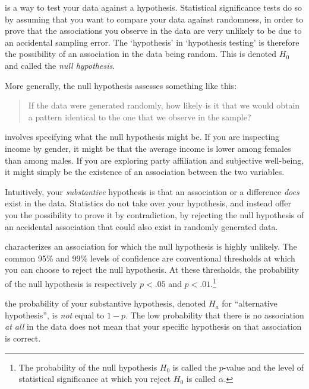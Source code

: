  is a way to test your data against a hypothesis. Statistical significance tests do so by assuming that you want to compare your data against randomness, in order to prove that the associations you observe in the data are very unlikely to be due to an accidental sampling error. The `hypothesis' in `hypothesis testing' is therefore the possibility of an association in the data being random. This is denoted $H_0$ and called the \emph{null hypothesis}.

More generally, the null hypothesis assesses something like this:

\begin{quote}
	If the data were generated randomly, how likely is it that we would obtain a pattern identical to the one that we observe in the sample?
\end{quote}

 involves specifying what the null hypothesis might be. If you are inspecting income by gender, it might be that the average income is lower among females than among males. If you are exploring party affiliation and subjective well-being, it might simply be the existence of an association between the two variables. 

Intuitively, your \emph{substantive} hypothesis is that an association or a difference \emph{does} exist in the data. Statistics do not take over your hypothesis, and instead offer you the possibility to prove it by contradiction, by rejecting the null hypothesis of an accidental association that could also exist in randomly generated data.

 characterizes an association for which the null hypothesis is highly unlikely. The common 95\% and 99\% levels of confidence are conventional thresholds at which you can choose to reject the null hypothesis. At these thresholds, the probability of the null hypothesis is respectively $p < .05$ and $p < .01$.\footnote{The probability of the null hypothesis $H_0$ is called the $p$-value and the level of statistical significance at which you reject $H_0$ is called $\alpha$.}

 the probability of your substantive hypothesis, denoted $H_a$ for ``alternative hypothesis'', is \emph{not} equal to $1 - p$. The low probability that there is no association \emph{at all} in the data does not mean that your specific hypothesis on that association is correct.

